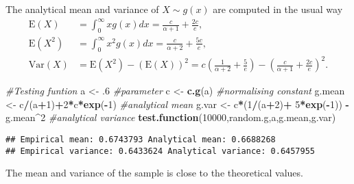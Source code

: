 \documentclass[]{article}
\newenvironment{Shaded}{\begin{snugshade}}{\end{snugshade}}
\newcommand{\CommentTok}[1]{\textcolor[rgb]{0.56,0.35,0.01}{\textit{#1}}}
\newcommand{\DecValTok}[1]{\textcolor[rgb]{0.00,0.00,0.81}{#1}}
\newcommand{\FloatTok}[1]{\textcolor[rgb]{0.00,0.00,0.81}{#1}}
\newcommand{\KeywordTok}[1]{\textcolor[rgb]{0.13,0.29,0.53}{\textbf{#1}}}
\newcommand{\NormalTok}[1]{#1}
\newcommand{\OperatorTok}[1]{\textcolor[rgb]{0.81,0.36,0.00}{\textbf{#1}}}
\newcommand{\StringTok}[1]{\textcolor[rgb]{0.31,0.60,0.02}{#1}}
\begin{document}
The analytical mean and variance of \(X\sim g(x)\) are computed in the
usual way \begin{align}
\text{E}(X) &=\int_0^\infty xg(x)dx=\frac{c}{\alpha+1}+\frac{2c}{e}, \\
\text{E}(X^2) &=\int_0^\infty x^2g(x)dx=\frac{c}{\alpha+2}+\frac{5c}{e}, \\
\text{Var}(X) &=\text{E}(X^2)-(\text{E}(X))^2 = c(\frac{1}{\alpha+2}+\frac{5}{e})-(\frac{c}{\alpha+1}+\frac{2c}{e})^2. 
\end{align}

\begin{Shaded}
\begin{Highlighting}[]
\CommentTok{#Testing funtion}
\NormalTok{a <-}\StringTok{ }\FloatTok{.6} \CommentTok{#parameter}
\NormalTok{c <-}\StringTok{ }\KeywordTok{c.g}\NormalTok{(a) }\CommentTok{#normalising constant}
\NormalTok{g.mean <-}\StringTok{ }\NormalTok{c}\OperatorTok{/}\NormalTok{(a}\OperatorTok{+}\DecValTok{1}\NormalTok{)}\OperatorTok{+}\DecValTok{2}\OperatorTok{*}\NormalTok{c}\OperatorTok{*}\KeywordTok{exp}\NormalTok{(}\OperatorTok{-}\DecValTok{1}\NormalTok{) }\CommentTok{#analytical mean}
\NormalTok{g.var <-}\StringTok{ }\NormalTok{c}\OperatorTok{*}\NormalTok{(}\DecValTok{1}\OperatorTok{/}\NormalTok{(a}\OperatorTok{+}\DecValTok{2}\NormalTok{)}\OperatorTok{+}\StringTok{ }\DecValTok{5}\OperatorTok{*}\KeywordTok{exp}\NormalTok{(}\OperatorTok{-}\DecValTok{1}\NormalTok{)) }\OperatorTok{-}\StringTok{ }\NormalTok{g.mean}\OperatorTok{^}\DecValTok{2} \CommentTok{#analytical variance}
\KeywordTok{test.function}\NormalTok{(}\DecValTok{10000}\NormalTok{,random.g,a,g.mean,g.var)}
\end{Highlighting}
\end{Shaded}

\begin{verbatim}
## Empirical mean: 0.6743793 Analytical mean: 0.6688268 
## Empirical variance: 0.6433624 Analytical variance: 0.6457955
\end{verbatim}

The mean and variance of the sample is close to the theoretical values.
\end{document}
